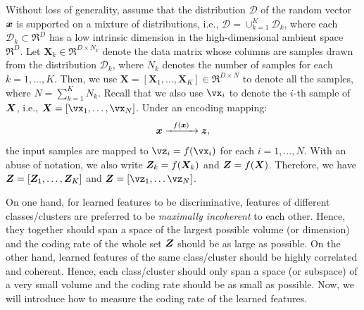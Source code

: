 \documentclass[../../book-main.tex]{subfiles}
\begin{document}

Without loss of generality, assume that the distribution $\mathcal D$ of the random vector $\bm{x}$ is supported on a mixture of distributions, i.e., $\mathcal D = \cup_{k=1}^K \mathcal{D}_k$,  where each $\mathcal{D}_k \subset \Re^D$ has a low intrinsic dimension in the high-dimensional ambient space $\Re^D$. Let $\bm X_k \in \Re^{D\times N_k}$ denote the data matrix whose columns are samples drawn from the distribution $\mathcal{D}_k$, where $N_k$ denotes the number of samples for each $k=1,\dots,K$. Then, we use $\bm X=[\bm X_1,\dots,\bm X_K] \in \Re^{D\times N}$ to denote all the samples, where $N=\sum_{k=1}^K N_k$. 
Recall that we also use $\vx_i$ to denote the $i$-th sample of $\bm{X}$, i.e., $\X=[\vx_1,\dots,\vx_N] $. Under an encoding mapping:
\begin{equation}
	\bm{x}   \xrightarrow{\hspace{2mm} f(\bm{x})\hspace{2mm}} \bm{z},
\end{equation}
the input samples are mapped to $\vz_i = f(\vx_i)$ for each $i=1,\dots,N$. With an abuse of notation, we also write $\bm{Z}_k = f(\bm{X}_k)$ and $\bm{Z} = f(\bm{X})$. Therefore, we have $\bm{Z} = [\bm Z_1,\dots,\bm Z_K]$ and $\Z = [\vz_1,\dots\vz_N]$. 

On one hand, for learned features to be discriminative, features of different classes/clusters are preferred to be {\em maximally incoherent} to each other. Hence, they together should span a space of the largest possible volume (or dimension) and the coding rate of the whole set $\bm{Z}$ should be as large as possible. On the other hand, learned features of the same class/cluster should be highly correlated and coherent. Hence, each class/cluster should only span a space (or subspace) of a very small volume and the coding rate should be as small as possible. Now, we will introduce how to measure the coding rate of the learned features.  
\end{document}
